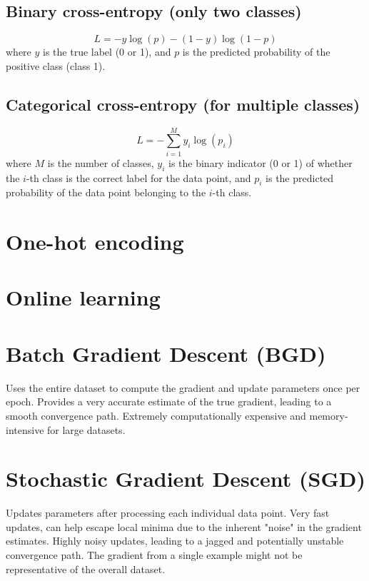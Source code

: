 \subsection{Binary cross-entropy (only two classes)}
\begin{equation}
  L = -y\log(p)-(1-y)\log(1-p)
\end{equation}
where $y$ is the true label (0 or 1), and $p$ is the predicted probability of the positive class (class 1).

\subsection{Categorical cross-entropy (for multiple classes)}
\begin{equation}
  L = -\sum_{i=1}^M y_i\log(p_i)
\end{equation}
where $M$ is the number of classes, $y_i$ is the binary indicator (0 or 1) of whether the $i$-th class is the correct label for the data point, and $p_i$ is the predicted probability of the data point belonging to the $i$-th class.

\section{One-hot encoding}

\section{Online learning}

\section{Batch Gradient Descent (BGD)}
Uses the entire dataset to compute the gradient and update parameters
once per epoch. Provides a very accurate estimate of the true
gradient, leading to a smooth convergence path. Extremely
computationally expensive and memory-intensive for large datasets.

\section{Stochastic Gradient Descent (SGD)}
Updates parameters after processing each individual data point. Very
fast updates, can help escape local minima due to the inherent "noise"
in the gradient estimates. Highly noisy updates, leading to a jagged
and potentially unstable convergence path. The gradient from a single
example might not be representative of the overall dataset.

